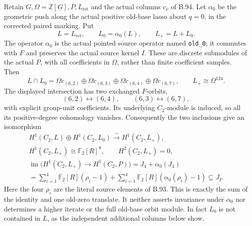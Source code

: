 \label{stmt:B95}
Retain $G,\Omega=\mathbb Z[G],P,L_{\mathrm{ret}}$ and the actual
columns $c_\nu$ of B.94. Let $\alpha_0$ be the geometric push along
the actual positive old-base lasso about $q=0$, in the corrected paired
marking. Put
\[
 L=L_{\mathrm{ret}},\qquad L_0=\alpha_0(L),\qquad L_+=L+L_0.
\]
The operator $\alpha_0$ is the actual pointed source operator named
\texttt{old\_0}; it commutes with $F$ and preserves the actual source
kernel $I$. These are discrete submodules of the actual $P$, with all
coefficients in $\Omega$, rather than finite coefficient samples.
Then
\begin{equation}\label{eq:B95-intersection}
 L\cap L_0=
   \Omega c_{(6,2)}\oplus\Omega c_{(6,3)}
     \oplus\Omega c_{(6,4)}\oplus\Omega c_{(6,7)},
 \qquad L_+\cong\Omega^{124}.
\end{equation}
The displayed intersection has two exchanged $F$-orbits,
\[
       (6,2)\longleftrightarrow(6,4),\qquad
       (6,3)\longleftrightarrow(6,7),
\]
with explicit group-unit coefficients. Its underlying $C_2$-module is
induced, so all its positive-degree cohomology vanishes. Consequently
the two inclusions give an isomorphism
\begin{equation}\label{eq:B95-cohomology}
 \begin{gathered}
 H^1(C_2,L)\oplus H^1(C_2,L_0)
       \xrightarrow{\sim}H^1(C_2,L_+),\\
 H^1(C_2,L_+)\cong\mathbb F_2[R]^8,
 \qquad H^2(C_2,L_+)=0,\\
 \operatorname{im}\bigl(H^1(C_2,L_+)\longrightarrow H^1(C_2,P)\bigr)
       =J_4+\alpha_0(J_4)\\
       =\sum_{i=1}^4\mathbb F_2[R](\rho_i-1)
         +\sum_{i=1}^4\mathbb F_2[R](\alpha_0(\rho_i)-1)
       \subseteq J_I.
 \end{gathered}
\end{equation}
Here the four $\rho_i$ are the literal source elements of B.93.
This is exactly the sum of the identity and one old-zero translate.
It neither asserts invariance under $\alpha_0$ nor determines a higher
iterate or the full old-base orbit module. In fact $L_0$ is not contained
in $L$, as the independent additional columns below show.

